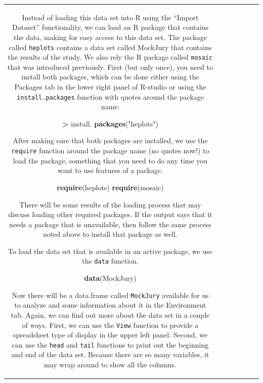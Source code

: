 \documentclass[]{book}
\newenvironment{Shaded}{\begin{snugshade}}{\end{snugshade}}
\newcommand{\KeywordTok}[1]{\textcolor[rgb]{0.13,0.29,0.53}{\textbf{#1}}}
\newcommand{\StringTok}[1]{\textcolor[rgb]{0.31,0.60,0.02}{#1}}
\newcommand{\OperatorTok}[1]{\textcolor[rgb]{0.81,0.36,0.00}{\textbf{#1}}}
\newcommand{\NormalTok}[1]{#1}
\theoremstyle{definition}
\theoremstyle{definition}
\theoremstyle{remark}
\begin{document}
\begin{longtable}[]{@{}ccccccc@{}}
\begin{minipage}[b]{0.10\columnwidth}
Instead of loading this data set into R using the ``Import Dataset''
functionality, we can load an R package that contains the data, making
for easy access to this data set. The package called \texttt{heplots}
\citep{R-heplots} contains a data set called MockJury that contains the
results of the study. We also rely the R package called \texttt{mosaic}
\citep{R-mosaic} that was introduced previously. First (but only once),
you need to install both packages, which can be done either using the
Packages tab in the lower right panel of R-studio or using the
\texttt{install.packages} function with quotes around the package name:

\begin{Shaded}
\begin{Highlighting}[]
\OperatorTok{>}\StringTok{ }\NormalTok{install. }\KeywordTok{packages}\NormalTok{(}\StringTok{"heplots"}\NormalTok{)}
\end{Highlighting}
\end{Shaded}

After making sure that both packages are installed, we use the
\texttt{require} function around the package name (no quotes now!) to
load the package, something that you need to do any time you want to use
features of a package.

\begin{Shaded}
\begin{Highlighting}[]
\KeywordTok{require}\NormalTok{(heplots)}
\KeywordTok{require}\NormalTok{(mosaic)}
\end{Highlighting}
\end{Shaded}

There will be some results of the loading process that may discuss
loading other required packages. If the output says that it needs a
package that is unavailable, then follow the same process noted above to
install that package as well.

To load the data set that is available in an active package, we use the
\texttt{data} function.

\begin{Shaded}
\begin{Highlighting}[]
\KeywordTok{data}\NormalTok{(MockJury)}
\end{Highlighting}
\end{Shaded}

Now there will be a data.frame called \texttt{MockJury} available for us
to analyze and some information about it in the Environment tab. Again,
we can find out more about the data set in a couple of ways. First, we
can use the \texttt{View} function to provide a spreadsheet type of
display in the upper left panel. Second, we can use the \texttt{head}
and \texttt{tail} functions to print out the beginning and end of the
data set. Because there are so many variables, it may wrap around to
show all the columns.


\end{minipage}
\end{longtable}
\end{document}
